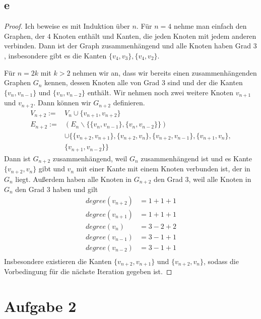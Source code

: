 \documentclass[a4paper,10pt]{article}
\begin{document}
\subsection*{e}

\begin{proof}
 Ich beweise es mit Induktion über $n$.
 Für $n = 4$ nehme man einfach den Graphen, der $4$ Knoten enthält und Kanten, die jeden Knoten mit jedem anderen verbinden.
 Dann ist der Graph zusammenhängend und alle Knoten haben Grad $3$, insbesondere gibt es die Kanten $\{v_4, v_3\}, \{v_4, v_2\}$.
 
 Für $n = 2k$ mit $k > 2$ nehmen wir an, dass wir bereits einen zusammenhängenden Graphen $G_n$ kennen, dessen Knoten alle von Grad $3$ sind und der die Kanten $\{v_n, v_{n - 1}\}$ und $\{v_n, v_{n - 2}\}$ enthält.
 Wir nehmen noch zwei weitere Knoten $v_{n + 1}$ und $v_{n + 2}$.
 Dann können wir $G_{n + 2}$ definieren.
 \begin{align*}
  V_{n + 2} := & V_n \cup \{ v_{n + 1}, v_{n + 2} \}\\
  E_{n + 2} := & (E_n \backslash \{ \{v_n, v_{n - 1}\}, \{v_n, v_{n - 2}\} \})\\
  & \cup \{ \{v_{n + 2}, v_{n + 1}\}, \{v_{n + 2}, v_n\}, \{v_{n + 2}, v_{n - 1}\}, \{v_{n + 1}, v_n\},\\
  & \{v_{n + 1}, v_{n - 2}\} \}
 \end{align*}
 Dann ist $G_{n + 2}$ zusammenhängend, weil $G_n$ zusammenhängend ist und es Kante $\{v_{n + 2}, v_n\}$ gibt und $v_n$ mit einer Kante mit einem Knoten verbunden ist, der in $G_n$ liegt.
 Außerdem haben alle Knoten in $G_{n + 2}$ den Grad $3$, weil alle Knoten in $G_n$ den Grad $3$ haben und gilt
 \begin{align*}
  degree(v_{n + 2}) & = 1 + 1 + 1\\
  degree(v_{n + 1}) & = 1 + 1 + 1\\
  degree(v_n) & = 3 - 2 + 2\\
  degree(v_{n - 1}) & = 3 - 1 + 1\\
  degree(v_{n - 2}) & = 3 - 1 + 1\\
 \end{align*}
 Insbesondere existieren die Kanten $\{v_{n + 2}, v_{n + 1}\}$ und $\{v_{n + 2}, v_n\}$, sodass die Vorbedingung für die nächste Iteration gegeben ist.
\end{proof}

\section*{Aufgabe 2}
\end{document}
